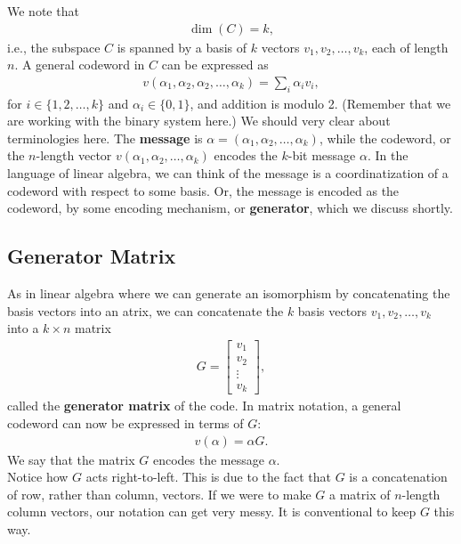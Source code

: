 \documentclass{article}
\theoremstyle{definition}
\begin{document}
We note that
\begin{align}
\dim(C) = k,
\end{align}
i.e., the subspace $C$ is spanned by a basis of $k$ vectors $v_1,v_2,\dots,v_k$, each of length $n$. A general codeword in $C$ can be expressed as
\begin{align}
v(\alpha_1,\alpha_2,\alpha_2,\dots,\alpha_k) = \sum_i \alpha_i v_i,
\end{align}
for $i\in \{1,2,\dots,k\}$ and $\alpha_i \in \{0,1\}$, and addition is modulo 2. (Remember that we are working with the binary system here.) We should very clear about terminologies here. The \textbf{message} is $\alpha = (\alpha_1,\alpha_2,\dots,\alpha_k)$, while the codeword, or the $n$-length vector $v(\alpha_1,\alpha_2,\dots,\alpha_k)$ encodes the $k$-bit message $\alpha$. In the language of linear algebra, we can think of the message is a coordinatization of a codeword with respect to some basis. Or, the message is encoded as the codeword, by some encoding mechanism, or \textbf{generator}, which we discuss shortly. 

 

\subsection{Generator Matrix}

As in linear algebra where we can generate an isomorphism by concatenating the basis vectors into an atrix, we can concatenate the $k$ basis vectors $v_1,v_2,\dots , v_k$ into a $k\times n$ matrix
\begin{align}
G = \begin{bmatrix}
v_1\\v_2\\\vdots\\v_k
\end{bmatrix},
\end{align}
called the \textbf{generator matrix} of the code. In matrix notation, a general codeword can now be expressed in terms of $G$:
\begin{align}
v(\alpha) = \alpha G.
\end{align}
We say that the matrix $G$ encodes the message $\alpha$.\\

Notice how $G$ acts right-to-left. This is due to the fact that $G$ is a concatenation of row, rather than column, vectors. If we were to make $G$ a matrix of $n$-length column vectors, our notation can get very messy. It is conventional to keep $G$ this way. 
\end{document}

